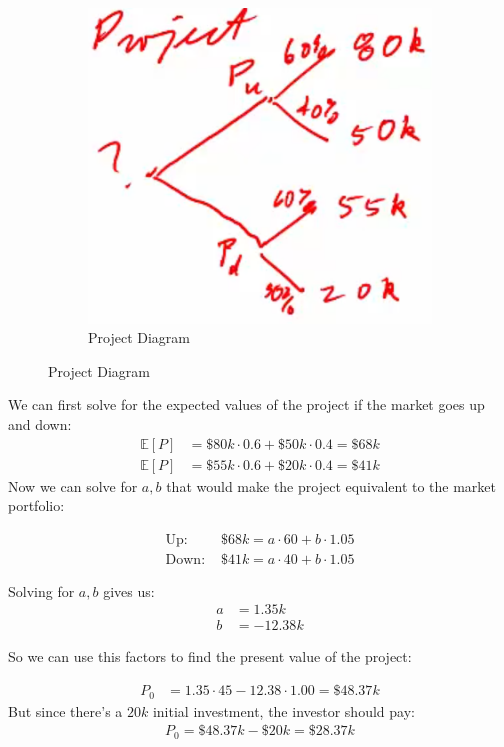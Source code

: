 \begin{example}
\begin{figure}[h!]
\begin{subfigure}[b]{0.4\textwidth}
            \includegraphics[width=\textwidth]{LECTURE_4/rep3.png}
            \caption{Project Diagram}
            \label{fig:idiosyncratic_project_diagram}
        \end{subfigure}

    \end{figure}

    We can first solve for the expected values of the project if the market goes up and down:
    \begin{align*}
        \mathbb{E}[P] & = \$80k \cdot 0.6 + \$50k \cdot 0.4 = \$68k \\
        \mathbb{E}[P] & = \$55k \cdot 0.6 + \$20k \cdot 0.4 = \$41k
    \end{align*}
    Now we can solve for $a, b$ that would make the project equivalent to the market portfolio:

    \begin{align*}
        \text{Up: }   & \$68k = a \cdot 60 + b \cdot 1.05 \\
        \text{Down: } & \$41k = a \cdot 40 + b \cdot 1.05
    \end{align*}

    Solving for $a, b$ gives us:
    \begin{align*}
        a & = 1.35k    \\
        b & = -12.38 k
    \end{align*}

    So we can use this factors to find the present value of the project:

    \begin{align*}
        P_0 & = 1.35 \cdot 45 - 12.38 \cdot 1.00 = \$48.37k
    \end{align*}
    But since there's a $20k$ initial investment, the investor should pay:
    \begin{align*}
        P_0 = \$48.37k - \$20k = \$28.37k
    \end{align*}
\end{example}

